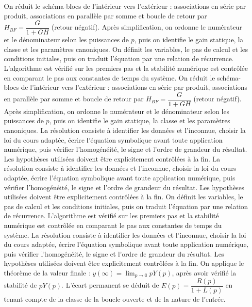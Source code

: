\begin{corrigebox}[Corrigé]
On réduit le schéma-blocs de l'intérieur vers l'extérieur : associations en série par produit, associations en parallèle par somme et boucle de retour par $H_{BF}=\dfrac{G}{1+GH}$ (retour négatif). Après simplification, on ordonne le numérateur et le dénominateur selon les puissances de $p$, puis on identifie le gain statique, la classe et les paramètres canoniques.
On définit les variables, le pas de calcul et les conditions initiales, puis on traduit l'équation par une relation de récurrence. L'algorithme est vérifié sur les premiers pas et la stabilité numérique est contrôlée en comparant le pas aux constantes de temps du système.
On réduit le schéma-blocs de l'intérieur vers l'extérieur : associations en série par produit, associations en parallèle par somme et boucle de retour par $H_{BF}=\dfrac{G}{1+GH}$ (retour négatif). Après simplification, on ordonne le numérateur et le dénominateur selon les puissances de $p$, puis on identifie le gain statique, la classe et les paramètres canoniques.
La résolution consiste à identifier les données et l'inconnue, choisir la loi du cours adaptée, écrire l'équation symbolique avant toute application numérique, puis vérifier l'homogénéité, le signe et l'ordre de grandeur du résultat. Les hypothèses utilisées doivent être explicitement contrôlées à la fin.
La résolution consiste à identifier les données et l'inconnue, choisir la loi du cours adaptée, écrire l'équation symbolique avant toute application numérique, puis vérifier l'homogénéité, le signe et l'ordre de grandeur du résultat. Les hypothèses utilisées doivent être explicitement contrôlées à la fin.
On définit les variables, le pas de calcul et les conditions initiales, puis on traduit l'équation par une relation de récurrence. L'algorithme est vérifié sur les premiers pas et la stabilité numérique est contrôlée en comparant le pas aux constantes de temps du système.
La résolution consiste à identifier les données et l'inconnue, choisir la loi du cours adaptée, écrire l'équation symbolique avant toute application numérique, puis vérifier l'homogénéité, le signe et l'ordre de grandeur du résultat. Les hypothèses utilisées doivent être explicitement contrôlées à la fin.
On applique le théorème de la valeur finale : $y(\infty)=\lim_{p\to0}pY(p)$, après avoir vérifié la stabilité de $pY(p)$. L'écart permanent se déduit de $E(p)=\dfrac{R(p)}{1+L(p)}$ en tenant compte de la classe de la boucle ouverte et de la nature de l'entrée.
\end{corrigebox}
